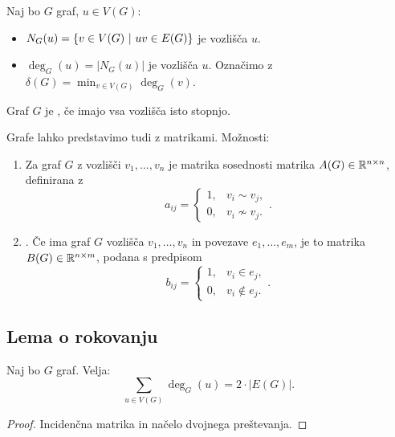\begin{definicija}
    Naj bo $G$ graf, $u \in V(G)$:
    \begin{itemize}
        \item $N_G(u) = \left\{v \in V(G) \ | \ uv \in E(G)\right\}$ je  vozlišča $u$.
        \item $\deg_G(u) = |N_G(u)|$ je  vozlišča $u$. Označimo z $\delta(G) = \min_{v \in V(G)}\deg_G(v)$.
    \end{itemize}
\end{definicija}

\begin{definicija}
    Graf $G$ je , če imajo vsa vozlišča isto stopnjo.
\end{definicija}

\begin{primer}
    Grafe lahko predstavimo tudi z matrikami. Možnosti:
    \begin{enumerate}
        \item {} Za graf $G$ z vozlišči $v_1, \ldots, v_n$ je matrika sosednosti matrika $A(G) \in \mathbb{R}^{n \times n}$, definirana z $$a_{ij} = \begin{cases}
            1, &v_i \sim v_j, \\
            0, &v_i \nsim v_j.
        \end{cases}.$$
        \item {}. Če ima graf $G$  vozlišča $v_1, \ldots, v_n$ in povezave $e_1, \ldots, e_m$, je to matrika $B(G) \in \mathbb{R}^{n \times m}$, podana s predpisom $$b_{ij} = \begin{cases}
            1, &v_i \in e_j, \\
            0, &v_i \notin e_j.
        \end{cases}.$$
    \end{enumerate}
\end{primer}

\subsection{Lema o rokovanju}
\begin{lema}
    Naj bo $G$ graf. Velja: $$\sum_{u \in V(G)} \deg_G(u) = 2 \cdot |E(G)|.$$
\end{lema}

\begin{proof}
    Incidenčna matrika in načelo dvojnega preštevanja.
\end{proof}

